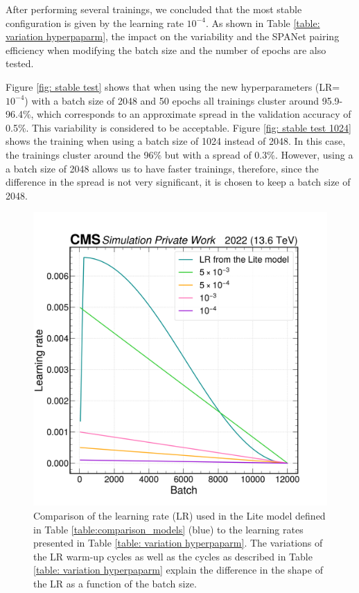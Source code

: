 After performing several trainings, we concluded that the most stable configuration is given by the learning rate $10^{-4}$. As shown in Table \ref{table: variation hyperpaparm}, the impact on the variability and the SPANet pairing efficiency when modifying the batch size and the number of epochs are also tested.

Figure \ref{fig: stable test} shows that when using the new hyperparameters (LR=$10^{-4}$) with a batch size of 2048 and 50 epochs all trainings cluster around 95.9-96.4\%, which corresponds to an approximate spread in the validation accuracy of 0.5\%. This variability is considered to be acceptable. Figure \ref{fig: stable test 1024} shows the training when using a batch size of 1024 instead of 2048. In this case, the trainings cluster around the 96\% but with a spread of 0.3\%. However, using a a batch size of 2048 allows us to have faster trainings, therefore, since the difference in the spread is not very significant, it is chosen to keep a batch size of 2048. 

\begin{figure}[hbt]
    \centering
    \includegraphics[width=0.6\linewidth]{Images/6.Improving/Variability Study/learning rate comp.png}
    \caption{Comparison of the learning rate (LR) used in the Lite model defined in Table \ref{table:comparison_models} (blue) to the learning rates presented in Table \ref{table: variation hyperpaparm}. The variations of the LR warm-up cycles as well as the cycles as described in Table \ref{table: variation hyperpaparm} explain the difference in the shape of the LR as a function of the batch size.}
    \label{fig: lr comp}
\end{figure}

